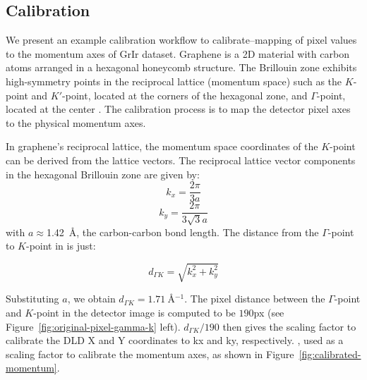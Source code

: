 \subsection{Calibration}
We present an example calibration workflow to calibrate--mapping of pixel values to the momentum axes of \gls{GrIr} dataset. Graphene is a 2D material with carbon atoms arranged in a hexagonal honeycomb structure. The Brillouin zone exhibits high-symmetry points in the reciprocal lattice (momentum space) such as the $K$-point and $K'$-point, located at the corners of the hexagonal zone, and $\Gamma$-point, located at the center \cite{castronetoElectronicPropertiesGraphene2009}. The calibration process is to map the detector pixel axes to the physical momentum axes.

In graphene's reciprocal lattice, the momentum space coordinates of the $K$-point can be derived from the lattice vectors. The reciprocal lattice vector components in the hexagonal Brillouin zone are given by:
\begin{equation*}
    k_x = \frac{2\pi}{3a}
\end{equation*}
\begin{equation*}
    k_y = \frac{2\pi}{3\sqrt{3}a}
\end{equation*}
with $a\approx$\qty{1.42}{\angstrom}, the carbon-carbon bond length. The distance from the $\Gamma$-point to $K$-point in is just:

\begin{equation*}
    d_{\Gamma K} = \sqrt{k_x^2 + k_y^2}
\end{equation*}

Substituting $a$, we obtain $d_{\Gamma K} = \qty{1.71}{\angstrom^{-1}}$. The pixel distance between the $\Gamma$-point and $K$-point in the detector image is computed to be $190$px (see Figure~\ref{fig:original-pixel-gamma-k} left). $d_{\Gamma K}/190$ then gives the scaling factor to calibrate the \gls{DLD} X and Y coordinates to \gls{kx} and \gls{ky}, respectively.
, used as a scaling factor to calibrate the momentum axes, as shown in Figure~\ref{fig:calibrated-momentum}.



